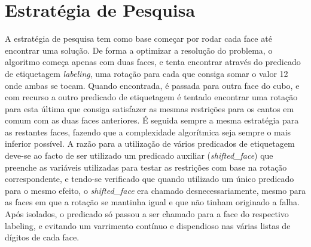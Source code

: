 \section{Estratégia de Pesquisa}
\label{rest:4}

A estratégia de pesquisa tem como base começar por rodar cada face até encontrar uma solução.
De forma a optimizar a resolução do problema, o algoritmo começa apenas com duas faces, e tenta encontrar através do predicado de etiquetagem \textit{labeling}, uma rotação para cada que consiga somar o valor 12 onde ambas se tocam.
Quando encontrada, é passada para outra face do cubo, e com recurso a outro predicado de etiquetagem é tentado encontrar uma rotação para esta última que consiga satisfazer as mesmas restrições para os cantos em comum com as duas faces anteriores. É seguida sempre a mesma estratégia para as restantes faces, fazendo que a complexidade algorítmica seja sempre o mais inferior possível.
A razão para a utilização de vários predicados de etiquetagem deve-se ao facto de ser utilizado um predicado auxiliar (\textit{shifted\_face}) que preenche as variáveis utilizadas para testar as restrições com base na rotação correspondente, e tendo-se verificado que quando utilizado um único predicado para o mesmo efeito, o \textit{shifted\_face} era chamado desnecessariamente, mesmo para as faces em que a rotação se mantinha igual e que não tinham originado a falha.
Após isolados, o predicado só passou a ser chamado para a face do respectivo labeling, e evitando um varrimento contínuo e dispendioso nas várias listas de dígitos de cada face.

%
